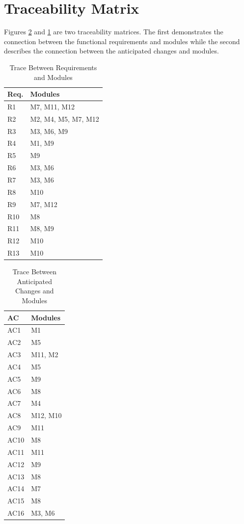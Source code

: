 \documentclass{article}
\begin{document}
\section*{Traceability Matrix}

Figures \ref{ac_trace} and \ref{mod_trace} are two traceability matrices. The first demonstrates the connection between the functional requirements and modules while the second describes the connection between the anticipated changes and modules.

\begin{table}[h!]
	\centering
	\begin{tabular}{p{} p{}}
		\toprule
		\textbf{Req.} & \textbf{Modules}\\
		\midrule
		R1 & M7, M11, M12\\
		R2 & M2, M4, M5, M7, M12\\
		R3 & M3, M6, M9\\
		R4 & M1, M9\\
		R5 & M9\\
		R6 & M3, M6\\
		R7 & M3, M6\\
		R8 & M10\\
		R9 & M7, M12\\
		R10 & M8\\ %
		R11 & M8, M9 \\ %
		R12 & M10\\
		R13 & M10\\
		\bottomrule
	\end{tabular}
	\caption{Trace Between Requirements and Modules}
	\label{mod_trace}
	
\end{table}

\begin{table}[h!]
	\centering
	\begin{tabular}{p{} p{}}
		\toprule
		\textbf{AC} & \textbf{Modules}\\
		\midrule
		AC1 & M1\\ 
		AC2 & M5\\
		AC3 & M11, M2\\
		AC4 & M5\\
		AC5 & M9\\
		AC6 & M8\\
		AC7 & M4\\
		AC8 & M12, M10\\
		AC9 & M11\\
		AC10 & M8\\
		AC11 & M11\\
		AC12 & M9\\
		AC13 & M8\\
		AC14 & M7\\
		AC15 & M8\\
		AC16 & M3, M6\\
		
		\bottomrule
	\end{tabular}
	\caption{Trace Between Anticipated Changes and Modules}
	\label{ac_trace}
\end{table}
\end{document}
